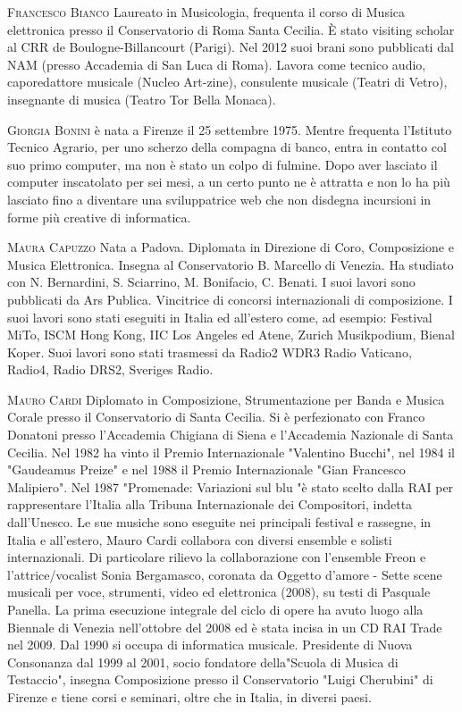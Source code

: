 \documentclass[9pt, twoside, a5paper]{extreport}
\newcommand{\biografia}[2]{%
\noindent \textsc{#1} %
#2 %
\medskip
}%
\begin{document}
\begin{multicols}{2}
\biografia{Francesco Bianco}{Laureato in Musicologia, frequenta il corso di Musica elettronica presso il Conservatorio di Roma Santa Cecilia. È stato visiting scholar al CRR de Boulogne-Billancourt (Parigi). Nel 2012 suoi brani sono pubblicati dal NAM (presso Accademia di San Luca di Roma). Lavora come tecnico audio, caporedattore musicale (Nucleo Art-zine), consulente musicale (Teatri di Vetro), insegnante di musica (Teatro Tor Bella Monaca).}

\biografia{Giorgia Bonini}{è nata a Firenze il 25 settembre 1975. Mentre frequenta l’Istituto Tecnico Agrario, per uno scherzo della compagna di banco, entra in contatto col suo primo computer, ma non è stato un colpo di fulmine. Dopo aver lasciato il computer inscatolato per sei mesi, a un certo punto ne è attratta e non lo ha più lasciato fino a diventare una sviluppatrice web che non disdegna incursioni in forme più creative di informatica.}

\biografia{Maura Capuzzo}{Nata a Padova. Diplomata in Direzione di Coro, Composizione e Musica Elettronica. Insegna al Conservatorio B. Marcello di Venezia. Ha studiato con N. Bernardini, S. Sciarrino, M. Bonifacio, C. Benati. I suoi lavori sono pubblicati da Ars Publica. Vincitrice di concorsi internazionali di composizione. I suoi lavori sono stati eseguiti in Italia ed all'estero come, ad esempio: Festival MiTo, ISCM Hong Kong, IIC Los Angeles ed Atene, Zurich Musikpodium, Bienal Koper. Suoi lavori sono stati trasmessi da Radio2 WDR3 Radio Vaticano, Radio4, Radio DRS2, Sveriges Radio.}

\biografia{Mauro Cardi}{Diplomato in Composizione, Strumentazione per Banda e Musica Corale presso il Conservatorio di Santa Cecilia. Si è perfezionato con Franco Donatoni presso l'Accademia Chigiana di Siena e l'Accademia Nazionale di Santa Cecilia.
Nel 1982 ha vinto il Premio Internazionale "Valentino Bucchi", nel 1984 il "Gaudeamus Preize" e nel 1988 il Premio Internazionale "Gian Francesco Malipiero". Nel 1987 "Promenade: Variazioni sul blu "è stato scelto dalla RAI per rappresentare l'Italia alla Tribuna Internazionale dei Compositori, indetta dall'Unesco. Le sue musiche sono eseguite nei principali festival e rassegne, in Italia e all'estero, Mauro Cardi collabora con diversi ensemble e solisti internazionali. Di particolare rilievo la collaborazione con l'ensemble Freon e l'attrice/vocalist Sonia Bergamasco, coronata da Oggetto d'amore - Sette scene musicali per voce, strumenti, video ed elettronica (2008), su testi di Pasquale Panella. La prima esecuzione integrale del ciclo di opere ha avuto luogo alla Biennale di Venezia nell'ottobre del 2008 ed è stata incisa in un CD RAI Trade nel 2009. Dal 1990 si occupa di informatica musicale. Presidente di Nuova Consonanza dal 1999 al 2001, socio fondatore della"Scuola di Musica di Testaccio", insegna Composizione presso il Conservatorio "Luigi Cherubini" di Firenze e tiene corsi e seminari, oltre che in Italia, in diversi paesi.}


\end{multicols}
\end{document}
